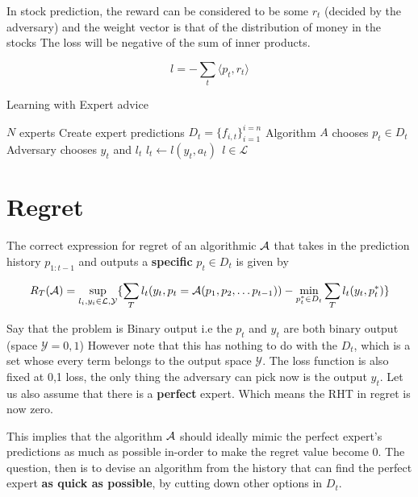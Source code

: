In stock prediction, the reward can be considered to be some $r_t$ (decided by the adversary) and the weight vector is that of the distribution of money in the stocks
The loss will be negative of the sum of inner products.

\begin{equation}
    \label{stock}
    l = - \sum_t \langle p_t ,r_t \rangle
\end{equation}




\begin{algorithm}[H]
    \caption{Learning with Expert advice}
    \begin{algorithmic}[1]
        \Require $N$ experts
            \State Create expert predictions $D_t = \{f_{i,t}\}_{i = 1}^{i = n}$
            \State Algorithm $A$ chooses $p_t \in D_t$
            \State Adversary chooses $y_t$ and $l_t$
            \State $l_t \gets l(y_t, a_t) \ \ l \in \mathcal{L}$ 
        \EndFor
    \end{algorithmic}
\end{algorithm}

\section*{Regret}
The correct expression for regret of an algorithmic $\mathcal{A}$ that takes in the prediction history $p_{1:t-1}$ and outputs a \textbf{specific} $p_t \in D_t$ is given by

\begin{equation}
    \label{Regret}
    R_T(\mathcal{A})  = \underset{l_i, y_i \in \mathcal{L,Y}}{\sup} \{\sum_T l_t(y_t, p_t = \mathcal{A}(p_1, p_2, \ldots p_{t-1}))  - \min_{p^*_t \in D_t} \sum_T l_t(y_t, p^*_t) \}
\end{equation}

Say that the problem is Binary output i.e the $p_t$ and $y_t$ are both binary output (space $\mathcal{Y} = {0,1}$)
However note that this has nothing to do with the $D_t$, which is a set whose every term belongs to the output space $\mathcal{Y}$.
The loss function is also fixed at 0,1 loss, the only thing the adversary can pick now is the output $y_t$.
Let us also assume that there is a \textbf{perfect} expert. Which means the RHT in regret is now zero.


This implies that the algorithm $\mathcal{A}$ should ideally mimic the perfect expert's predictions as much as possible in-order to make the regret value become 0.
The question, then is to devise an algorithm from the history that can find the perfect expert \textbf{as quick as possible}, by cutting down other options in $D_t$.

